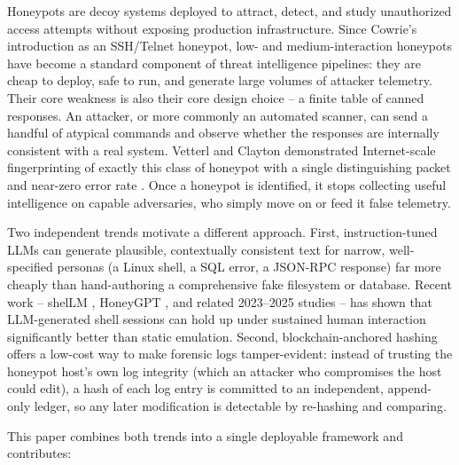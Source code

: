 \documentclass[conference]{IEEEtran}
\begin{document}
Honeypots are decoy systems deployed to attract, detect, and study
unauthorized access attempts without exposing production infrastructure.
Since Cowrie's introduction as an SSH/Telnet honeypot, low- and
medium-interaction honeypots have become a standard component of threat
intelligence pipelines: they are cheap to deploy, safe to run, and generate
large volumes of attacker telemetry. Their core weakness is also their core
design choice -- a finite table of canned responses. An attacker, or more
commonly an automated scanner, can send a handful of atypical commands and
observe whether the responses are internally consistent with a real system.
Vetterl and Clayton demonstrated Internet-scale fingerprinting of exactly this
class of honeypot with a single distinguishing packet and near-zero error rate
\cite{vetterl2018bitter}. Once a honeypot is identified, it stops collecting
useful intelligence on capable adversaries, who simply move on or feed it
false telemetry.

Two independent trends motivate a different approach. First, instruction-tuned
LLMs can generate plausible, contextually consistent text for narrow,
well-specified personas (a Linux shell, a SQL error, a JSON-RPC response) far
more cheaply than hand-authoring a comprehensive fake filesystem or database.
Recent work -- shelLM \cite{sladic2024shellm}, HoneyGPT \cite{wang2024honeygpt},
and related 2023--2025 studies \cite{mckee2023chatbots,llmhoneypot2024} -- has
shown that LLM-generated shell sessions can hold up under sustained human
interaction significantly better than static emulation. Second,
blockchain-anchored hashing offers a low-cost way to make forensic logs
tamper-evident: instead of trusting the honeypot host's own log integrity
(which an attacker who compromises the host could edit), a hash of each log
entry is committed to an independent, append-only ledger, so any later
modification is detectable by re-hashing and comparing.

This paper combines both trends into a single deployable framework and
contributes:
\end{document}
